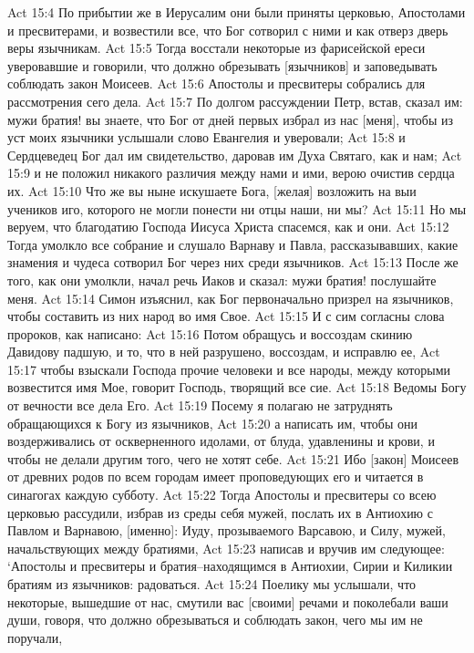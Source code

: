 Act 15:4  По прибытии же в Иерусалим они были приняты церковью, Апостолами и пресвитерами, и возвестили все, что Бог сотворил с ними и как отверз дверь веры язычникам.
Act 15:5  Тогда восстали некоторые из фарисейской ереси уверовавшие и говорили, что должно обрезывать [язычников] и заповедывать соблюдать закон Моисеев.
Act 15:6  Апостолы и пресвитеры собрались для рассмотрения сего дела.
Act 15:7  По долгом рассуждении Петр, встав, сказал им: мужи братия! вы знаете, что Бог от дней первых избрал из нас [меня], чтобы из уст моих язычники услышали слово Евангелия и уверовали;
Act 15:8  и Сердцеведец Бог дал им свидетельство, даровав им Духа Святаго, как и нам;
Act 15:9  и не положил никакого различия между нами и ими, верою очистив сердца их.
Act 15:10  Что же вы ныне искушаете Бога, [желая] возложить на выи учеников иго, которого не могли понести ни отцы наши, ни мы?
Act 15:11  Но мы веруем, что благодатию Господа Иисуса Христа спасемся, как и они.
Act 15:12  Тогда умолкло все собрание и слушало Варнаву и Павла, рассказывавших, какие знамения и чудеса сотворил Бог через них среди язычников.
Act 15:13  После же того, как они умолкли, начал речь Иаков и сказал: мужи братия! послушайте меня.
Act 15:14  Симон изъяснил, как Бог первоначально призрел на язычников, чтобы составить из них народ во имя Свое.
Act 15:15  И с сим согласны слова пророков, как написано:
Act 15:16  Потом обращусь и воссоздам скинию Давидову падшую, и то, что в ней разрушено, воссоздам, и исправлю ее,
Act 15:17  чтобы взыскали Господа прочие человеки и все народы, между которыми возвестится имя Мое, говорит Господь, творящий все сие.
Act 15:18  Ведомы Богу от вечности все дела Его.
Act 15:19  Посему я полагаю не затруднять обращающихся к Богу из язычников,
Act 15:20  а написать им, чтобы они воздерживались от оскверненного идолами, от блуда, удавленины и крови, и чтобы не делали другим того, чего не хотят себе.
Act 15:21  Ибо [закон] Моисеев от древних родов по всем городам имеет проповедующих его и читается в синагогах каждую субботу.
Act 15:22  Тогда Апостолы и пресвитеры со всею церковью рассудили, избрав из среды себя мужей, послать их в Антиохию с Павлом и Варнавою, [именно]: Иуду, прозываемого Варсавою, и Силу, мужей, начальствующих между братиями,
Act 15:23  написав и вручив им следующее: `Апостолы и пресвитеры и братия--находящимся в Антиохии, Сирии и Киликии братиям из язычников: радоваться.
Act 15:24  Поелику мы услышали, что некоторые, вышедшие от нас, смутили вас [своими] речами и поколебали ваши души, говоря, что должно обрезываться и соблюдать закон, чего мы им не поручали,
